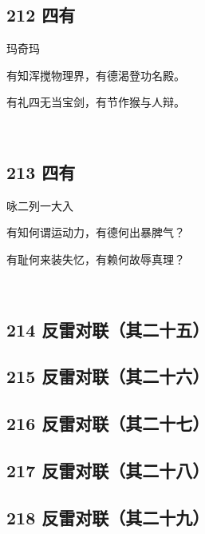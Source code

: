 \hypertarget{ux56dbux6709}{%
\subsection{212 四有}\label{ux56dbux6709}}

玛奇玛

有知浑搅物理界，有德渴登功名殿。

有礼四无当宝剑，有节作猴与人辩。

~\\

\hypertarget{ux56dbux6709-1}{%
\subsection{213 四有}\label{ux56dbux6709-1}}

咏二列一大入

有知何谓运动力，有德何出暴脾气？

有耻何来装失忆，有赖何故辱真理？

~\\

\hypertarget{ux53cdux96f7ux5bf9ux8054ux5176ux4e8cux5341ux4e94}{%
\subsection{214
反雷对联（其二十五）}\label{ux53cdux96f7ux5bf9ux8054ux5176ux4e8cux5341ux4e94}}

\hypertarget{ux53cdux96f7ux5bf9ux8054ux5176ux4e8cux5341ux516d}{%
\subsection{215
反雷对联（其二十六）}\label{ux53cdux96f7ux5bf9ux8054ux5176ux4e8cux5341ux516d}}

\hypertarget{ux53cdux96f7ux5bf9ux8054ux5176ux4e8cux5341ux4e03}{%
\subsection{216
反雷对联（其二十七）}\label{ux53cdux96f7ux5bf9ux8054ux5176ux4e8cux5341ux4e03}}

\hypertarget{ux53cdux96f7ux5bf9ux8054ux5176ux4e8cux5341ux516b}{%
\subsection{217
反雷对联（其二十八）}\label{ux53cdux96f7ux5bf9ux8054ux5176ux4e8cux5341ux516b}}

\hypertarget{ux53cdux96f7ux5bf9ux8054ux5176ux4e8cux5341ux4e5d}{%
\subsection{218
反雷对联（其二十九）}\label{ux53cdux96f7ux5bf9ux8054ux5176ux4e8cux5341ux4e5d}}

